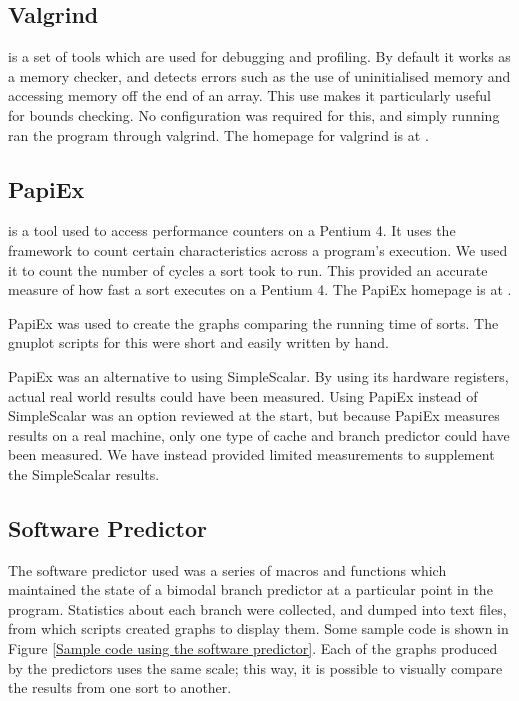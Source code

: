 \subsection{Valgrind}
\label{Valgrind}
 is a set of tools which are used for debugging and profiling. By
default it works as a memory checker, and detects errors such as the use of
uninitialised memory and accessing memory off the end of an array. This use
makes it particularly useful for bounds checking. No configuration was required
for this, and simply running  ran the program through
valgrind. The homepage for valgrind is at .

\subsection{PapiEx}
 is a tool used to access performance counters on a Pentium 4. It uses
the  framework to count certain characteristics across a program's
execution. We used it to count the number of cycles a sort took to run. This
provided an accurate measure of how fast a sort executes on a Pentium 4. The
PapiEx homepage is at .

PapiEx was used to create the graphs comparing the running time of sorts.
The gnuplot scripts for this were short and easily written by hand.

PapiEx was an alternative to using SimpleScalar. By using its hardware
registers, actual real world results could have been measured. Using PapiEx
instead of SimpleScalar was an option reviewed at the start, but because PapiEx
measures results on a real machine, only one type of cache and branch predictor
could have been measured. We have instead provided limited measurements to
supplement the SimpleScalar results.

\subsection{Software Predictor}
The software predictor used was a series of macros and functions which
maintained the state of a bimodal branch predictor at a particular point in the
program. Statistics about each branch were collected, and dumped into text
files, from which scripts created graphs to display them. Some sample code is
shown in Figure \ref{Sample code using the software predictor}. Each of the
graphs produced by the predictors uses the same scale; this way, it is possible
to visually compare the results from one sort to another.

